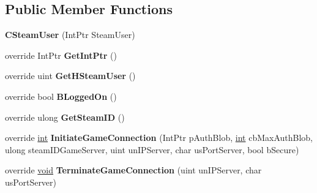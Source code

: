\subsection*{Public Member Functions}
\begin{DoxyCompactItemize}
\item 
\hypertarget{classValve_1_1Steamworks_1_1CSteamUser_ab0511020b27d41d255b3f561919e9c61}{}{\bfseries C\+Steam\+User} (Int\+Ptr Steam\+User)\label{classValve_1_1Steamworks_1_1CSteamUser_ab0511020b27d41d255b3f561919e9c61}

\item 
\hypertarget{classValve_1_1Steamworks_1_1CSteamUser_a8ef616bb07361eadaace0f9f5dc712fb}{}override Int\+Ptr {\bfseries Get\+Int\+Ptr} ()\label{classValve_1_1Steamworks_1_1CSteamUser_a8ef616bb07361eadaace0f9f5dc712fb}

\item 
\hypertarget{classValve_1_1Steamworks_1_1CSteamUser_a5e058c6559ad19e1964b162066064094}{}override uint {\bfseries Get\+H\+Steam\+User} ()\label{classValve_1_1Steamworks_1_1CSteamUser_a5e058c6559ad19e1964b162066064094}

\item 
\hypertarget{classValve_1_1Steamworks_1_1CSteamUser_a1c02870163bb4ac81ce464ac377decde}{}override bool {\bfseries B\+Logged\+On} ()\label{classValve_1_1Steamworks_1_1CSteamUser_a1c02870163bb4ac81ce464ac377decde}

\item 
\hypertarget{classValve_1_1Steamworks_1_1CSteamUser_a6b173b42056b04d25f68c6f9f23958ae}{}override ulong {\bfseries Get\+Steam\+I\+D} ()\label{classValve_1_1Steamworks_1_1CSteamUser_a6b173b42056b04d25f68c6f9f23958ae}

\item 
\hypertarget{classValve_1_1Steamworks_1_1CSteamUser_a0774feba5896b7407cc818b756f9694f}{}override \hyperlink{SDL__thread_8h_a6a64f9be4433e4de6e2f2f548cf3c08e}{int} {\bfseries Initiate\+Game\+Connection} (Int\+Ptr p\+Auth\+Blob, \hyperlink{SDL__thread_8h_a6a64f9be4433e4de6e2f2f548cf3c08e}{int} cb\+Max\+Auth\+Blob, ulong steam\+I\+D\+Game\+Server, uint un\+I\+P\+Server, char us\+Port\+Server, bool b\+Secure)\label{classValve_1_1Steamworks_1_1CSteamUser_a0774feba5896b7407cc818b756f9694f}

\item 
\hypertarget{classValve_1_1Steamworks_1_1CSteamUser_a1c041a5393b810a3e85000487fe70a39}{}override \hyperlink{SDL__audio_8h_a52835ae37c4bb905b903cbaf5d04b05f}{void} {\bfseries Terminate\+Game\+Connection} (uint un\+I\+P\+Server, char us\+Port\+Server)\label{classValve_1_1Steamworks_1_1CSteamUser_a1c041a5393b810a3e85000487fe70a39}


\end{DoxyCompactItemize}
